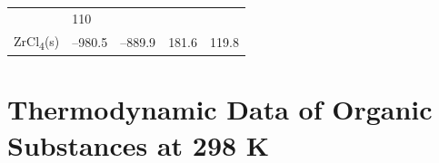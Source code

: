 \documentclass[
  9pt,
]{extbook}
\theoremstyle{definition}
\theoremstyle{definition}
\theoremstyle{definition}
\theoremstyle{remark}
\begin{document}
\begin{longtable}[]{@{}lllll@{}}
\begin{minipage}[t]{0.20\columnwidth}
\end{minipage} & \begin{minipage}[t]{0.18\columnwidth}\raggedright
110\strut
\end{minipage} & \begin{minipage}[t]{0.18\columnwidth}\raggedright
\strut
\end{minipage}\tabularnewline
\begin{minipage}[t]{0.10\columnwidth}\raggedright
ZrCl\textsubscript{4}(s)\strut
\end{minipage} & \begin{minipage}[t]{0.19\columnwidth}\raggedright
--980.5\strut
\end{minipage} & \begin{minipage}[t]{0.20\columnwidth}\raggedright
--889.9\strut
\end{minipage} & \begin{minipage}[t]{0.18\columnwidth}\raggedright
181.6\strut
\end{minipage} & \begin{minipage}[t]{0.18\columnwidth}\raggedright
119.8\strut
\end{minipage}\tabularnewline
\bottomrule
\end{longtable}

\hypertarget{thermodynamic-data-of-organic-substances-at-298-k}{%
\section{Thermodynamic Data of Organic Substances at 298 K}\label{thermodynamic-data-of-organic-substances-at-298-k}}
\end{document}
